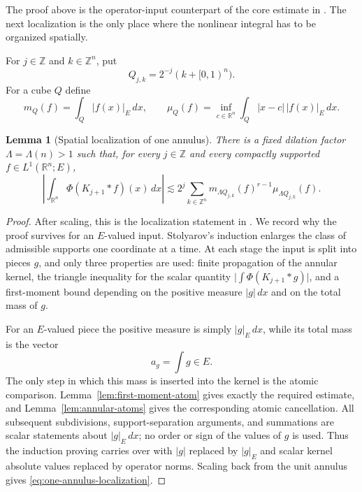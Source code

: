 \documentclass[10pt,a4paper]{amsart}
\numberwithin{equation}{section}
\newtheorem{lemma}[theorem]{Lemma}
\newcommand{\R}{\mathbb R}
\begin{document}
The proof above is the operator-input counterpart of the core estimate in
\cite[Lemma~3.1 and Corollary~3.2]{Stolyarov24}.  The next localization is the
only place where the nonlinear integral has to be organized spatially.

For $j\in\mathbb Z$ and $k\in\mathbb Z^n$, put
\[
 Q_{j,k}=2^{-j}(k+[0,1)^n).
\]
For a cube $Q$ define
\begin{equation}\label{eq:mass-moment}
 m_Q(f)=\int_Q|f(x)|_E\,dx,
 \qquad
 \mu_Q(f)=\inf_{c\in\R^n}\int_Q|x-c|\,|f(x)|_E\,dx.
\end{equation}

\begin{lemma}[Spatial localization of one annulus]\label{lem:one-annulus-localization}
There is a fixed dilation factor $\Lambda=\Lambda(n)>1$ such that, for every
$j\in\mathbb Z$ and every compactly supported $f\in L^1(\R^n;E)$,
\begin{equation}\label{eq:one-annulus-localization}
 \left|\int_{\R^n}\Phi(K_{j+1}*f)(x)\,dx\right|
 \lesssim
 2^j\sum_{k\in\mathbb Z^n}
 m_{\Lambda Q_{j,k}}(f)^{r-1}\mu_{\Lambda Q_{j,k}}(f).
\end{equation}
\end{lemma}

\begin{proof}
After scaling, this is the localization statement in
\cite[Theorem~3.1 and its proof]{Stolyarov24}.  We record why the proof survives
for an $E$-valued input.  Stolyarov's induction enlarges the class of admissible
supports one coordinate at a time.  At each stage the input is split into
pieces $g$, and only three properties are used: finite propagation of the
annular kernel, the triangle inequality for the scalar quantity
$\bigl|\int\Phi(K_{j+1}*g)\bigr|$, and a first-moment bound depending on the
positive measure $|g|\,dx$ and on the total mass of $g$.

For an $E$-valued piece the positive measure is simply $|g|_E\,dx$, while its
total mass is the vector
\[
 a_g=\int g\in E.
\]
The only step in which this mass is inserted into the kernel is the atomic
comparison.  Lemma~\ref{lem:first-moment-atom} gives exactly the required
estimate, and Lemma~\ref{lem:annular-atoms} gives the corresponding atomic
cancellation.  All subsequent subdivisions, support-separation arguments, and
summations are scalar statements about $|g|_E\,dx$; no order or sign of the
values of $g$ is used.  Thus the induction proving
\cite[Theorem~3.1]{Stolyarov24} carries over with $|g|$ replaced by $|g|_E$
and scalar kernel absolute values replaced by operator norms.  Scaling back
from the unit annulus gives \eqref{eq:one-annulus-localization}.
\end{proof}
\end{document}
